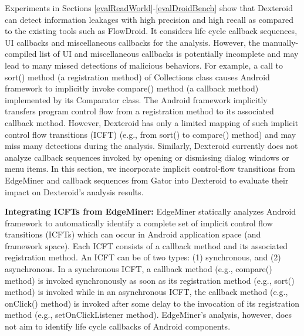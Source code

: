\documentclass[10pt]{elsarticle}
\begin{document}
Experiments in Sections \ref{evalReadWorld}-\ref{evalDroidBench} show that Dexteroid can detect information leakages with high precision and high recall as compared to the existing tools such as FlowDroid. It considers life cycle callback sequences, UI callbacks and miscellaneous callbacks for the analysis. However, the manually-compiled list of UI and miscellaneous callbacks is potentially incomplete and may lead to many missed detections of malicious behaviors. For example, a call to {\ttfamily sort()} method (a registration method) of {\ttfamily Collections} class causes Android framework to implicitly invoke {\ttfamily compare()} method (a callback method) implemented by its {\ttfamily Comparator} class. The Android framework implicitly transfers program control flow from a registration method to its associated callback method. However, Dexteroid has only a limited mapping of such implicit control flow transitions (ICFT) (e.g., from {\ttfamily sort()} to {\ttfamily compare()} method) and may miss many detections during the analysis. Similarly, Dexteroid currently does not analyze callback sequences invoked by opening or dismissing dialog windows or menu items. In this section, we incorporate implicit control-flow transitions from EdgeMiner \cite{EdgeMiner} and callback sequences from Gator \cite{GATORWTG} into Dexteroid to evaluate their impact on Dexteroid's analysis results.

{\noindent \bf Integrating ICFTs from EdgeMiner:} EdgeMiner \cite{EdgeMiner} statically analyzes Android framework to automatically identify a complete set of implicit control flow transitions (ICFTs) which can occur in Android application space (and framework space). Each ICFT consists of a callback method and its associated registration method. An ICFT can be of two types: (1) synchronous, and (2) asynchronous. In a synchronous ICFT, a callback method (e.g., {\ttfamily compare()} method) is invoked synchronously as soon as its registration method (e.g., {\ttfamily sort()} method) is invoked while in an asynchronous ICFT, the callback method (e.g., {\ttfamily onClick()} method) is invoked after some delay to the invocation of its registration method (e.g., {\ttfamily setOnClickListener} method). EdgeMiner's analysis, however, does not aim to identify life cycle callbacks of Android components.
	
\end{document}
